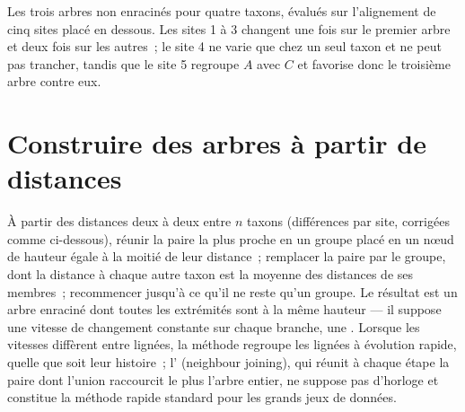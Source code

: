 \begin{omfigure}

{\small Les trois arbres non enracinés pour quatre taxons, évalués sur
l'alignement de cinq sites placé en dessous. Les sites 1 à 3 changent une
fois sur le premier arbre et deux fois sur les autres~; le site 4 ne varie
que chez un seul taxon et ne peut pas trancher, tandis que le site 5
regroupe $A$ avec $C$ et favorise donc le troisième arbre contre eux.}
\end{omfigure}

\section{Construire des arbres à partir de distances}

\begin{method}\label{meth:b2:phylogenetic-trees:upgma}
À partir des distances deux à deux entre $n$ taxons (différences par site,
corrigées comme ci-dessous), réunir la paire la plus proche en un groupe
placé en un nœud de hauteur égale à la moitié de leur distance~; remplacer
la paire par le groupe, dont la distance à chaque autre taxon est la
moyenne des distances de ses membres~; recommencer jusqu'à ce qu'il ne
reste qu'un groupe. Le résultat
est un arbre enraciné dont toutes les extrémités sont à la même hauteur
--- il suppose une vitesse de changement constante sur chaque branche,
une . Lorsque les vitesses diffèrent entre lignées, la
méthode regroupe les lignées à évolution rapide, quelle que soit leur
histoire~; l'\emph{} (neighbour joining),
qui réunit à chaque étape la paire dont l'union raccourcit le plus
l'arbre entier, ne suppose pas d'horloge et constitue la méthode rapide
standard pour les grands jeux de données.
\end{method}

